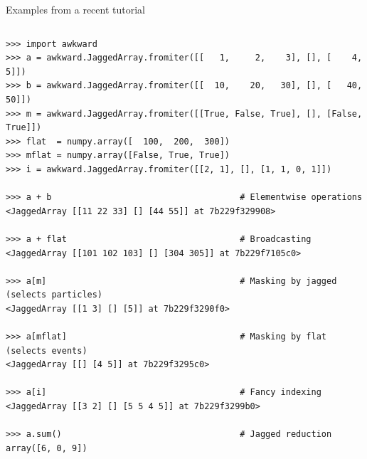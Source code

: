\documentclass[aspectratio=169]{beamer}
\begin{document}
\begin{frame}[fragile]{Examples from a recent tutorial}
\scriptsize
\vspace{0.25 cm}
\begin{columns}
\begin{verbatim}
>>> import awkward
>>> a = awkward.JaggedArray.fromiter([[   1,     2,    3], [], [    4,    5]])
>>> b = awkward.JaggedArray.fromiter([[  10,    20,   30], [], [   40,   50]])
>>> m = awkward.JaggedArray.fromiter([[True, False, True], [], [False, True]])
>>> flat  = numpy.array([  100,  200,  300])
>>> mflat = numpy.array([False, True, True])
>>> i = awkward.JaggedArray.fromiter([[2, 1], [], [1, 1, 0, 1]])

>>> a + b                                     # Elementwise operations
<JaggedArray [[11 22 33] [] [44 55]] at 7b229f329908>

>>> a + flat                                  # Broadcasting
<JaggedArray [[101 102 103] [] [304 305]] at 7b229f7105c0>

>>> a[m]                                      # Masking by jagged (selects particles)
<JaggedArray [[1 3] [] [5]] at 7b229f3290f0>

>>> a[mflat]                                  # Masking by flat (selects events)
<JaggedArray [[] [4 5]] at 7b229f3295c0>

>>> a[i]                                      # Fancy indexing
<JaggedArray [[3 2] [] [5 5 4 5]] at 7b229f3299b0>

>>> a.sum()                                   # Jagged reduction
array([6, 0, 9])
\end{verbatim}
\end{columns}
\end{frame}
\end{document}
